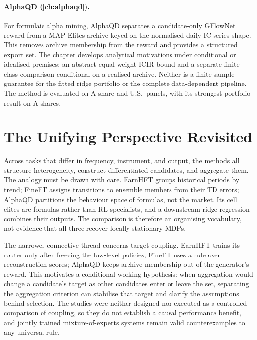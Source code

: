 \paragraph{AlphaQD (\cref{ch:alphaqd}).} For formulaic alpha mining, AlphaQD separates a candidate-only GFlowNet reward from a MAP-Elites archive keyed on the normalised daily IC-series shape. This removes archive membership from the reward and provides a structured export set. The chapter develops analytical motivations under conditional or idealised premises: an abstract equal-weight ICIR bound and a separate finite-class comparison conditional on a realised archive. Neither is a finite-sample guarantee for the fitted ridge portfolio or the complete data-dependent pipeline. The method is evaluated on A-share and U.S.\ panels, with its strongest portfolio result on A-shares.

\section{The Unifying Perspective Revisited}
\label{sec:concl_perspective}

Across tasks that differ in frequency, instrument, and output, the methods all structure heterogeneity, construct differentiated candidates, and aggregate them. The analogy must be drawn with care. EarnHFT groups historical periods by trend; FineFT assigns transitions to ensemble members from their TD errors; AlphaQD partitions the behaviour space of formulas, not the market. Its cell elites are formulas rather than RL specialists, and a downstream ridge regression combines their outputs. The comparison is therefore an organising vocabulary, not evidence that all three recover locally stationary MDPs.

The narrower connective thread concerns target coupling. EarnHFT trains its router only after freezing the low-level policies; FineFT uses a rule over reconstruction scores; AlphaQD keeps archive membership out of the generator's reward. This motivates a conditional working hypothesis: when aggregation would change a candidate's target as other candidates enter or leave the set, separating the aggregation criterion can stabilise that target and clarify the assumptions behind selection. The studies were neither designed nor executed as a controlled comparison of coupling, so they do not establish a causal performance benefit, and jointly trained mixture-of-experts systems remain valid counterexamples to any universal rule.

